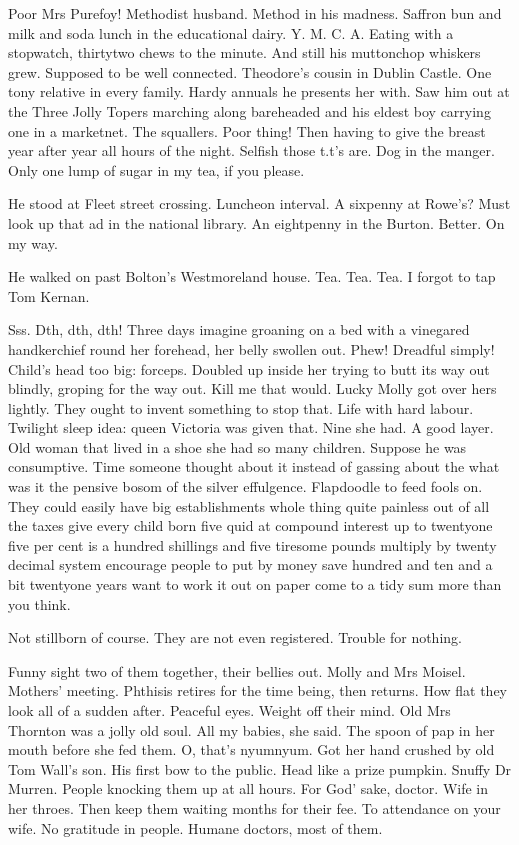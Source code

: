 Poor Mrs Purefoy! Methodist husband. Method in his madness.
Saffron bun and milk and soda lunch in the educational dairy. Y. M. C. A.
Eating with a stopwatch, thirtytwo chews to the minute. And still his
muttonchop whiskers grew. Supposed to be well connected. Theodore's
cousin in Dublin Castle. One tony relative in every family. Hardy annuals
he presents her with. Saw him out at the Three Jolly Topers marching along
bareheaded and his eldest boy carrying one in a marketnet. The squallers.
Poor thing! Then having to give the breast year after year all hours of
the night. Selfish those t.t's are. Dog in the manger. Only one lump of
sugar in my tea, if you please.

He stood at Fleet street crossing. Luncheon interval. A sixpenny at
Rowe's? Must look up that ad in the national library. An eightpenny in the
Burton. Better. On my way.

He walked on past Bolton's Westmoreland house. Tea. Tea. Tea. I forgot
to tap Tom Kernan.

Sss. Dth, dth, dth! Three days imagine groaning on a bed with a
vinegared handkerchief round her forehead, her belly swollen out. Phew!
Dreadful simply! Child's head too big: forceps. Doubled up inside her
trying to butt its way out blindly, groping for the way out. Kill me that
would. Lucky Molly got over hers lightly. They ought to invent something
to stop that. Life with hard labour. Twilight sleep idea: queen Victoria
was given that. Nine she had. A good layer. Old woman that lived in a shoe
she had so many children. Suppose he was consumptive. Time someone thought
about it instead of gassing about the what was it the pensive bosom of the
silver effulgence. Flapdoodle to feed fools on. They could easily have big
establishments whole thing quite painless out of all the taxes give every
child born five quid at compound interest up to twentyone five per cent is
a hundred shillings and five tiresome pounds multiply by twenty decimal
system encourage people to put by money save hundred and ten and a bit
twentyone years want to work it out on paper come to a tidy sum more than
you think.

Not stillborn of course. They are not even registered. Trouble for
nothing.

Funny sight two of them together, their bellies out. Molly and Mrs
Moisel. Mothers' meeting. Phthisis retires for the time being, then
returns. How flat they look all of a sudden after. Peaceful eyes.
Weight off their mind. Old Mrs Thornton was a jolly old soul. All
my babies, she said. The spoon of pap in her mouth before she fed
them. O, that's nyumnyum. Got her hand crushed by old Tom Wall's son.
His first bow to the public. Head like a prize pumpkin. Snuffy Dr Murren.
People knocking them up at all hours. For God' sake, doctor. Wife in
her throes. Then keep them waiting months for their fee. To attendance
on your wife. No gratitude in people. Humane doctors, most of them.

